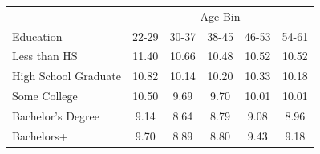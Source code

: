 \begin{tabular}{lccccc}
\hline\hline
 & \multicolumn{5}{c}{Age Bin} \\
Education & 22-29 & 30-37 & 38-45 & 46-53 & 54-61 \\
\hline
Less than HS&11.40&10.66&10.48&10.52&10.52\\
High School Graduate&10.82&10.14&10.20&10.33&10.18\\
Some College&10.50&9.69&9.70&10.01&10.01\\
Bachelor's Degree&9.14&8.64&8.79&9.08&8.96\\
Bachelors+&9.70&8.89&8.80&9.43&9.18\\
\hline\hline
\end{tabular}
